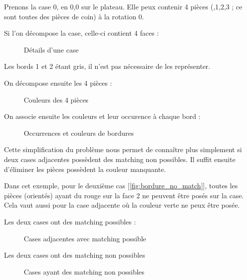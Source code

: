 	\begin{exmp}
		Prenons la case 0, en 0,0 sur le plateau. Elle peux contenir 4 pièces (,1,2,3 ; ce sont toutes des pièces de coin) à la rotation 0.
		
		
		Si l'on décompose la case, celle-ci contient 4 faces :
		
		\begin{figure}[H]
			

			\caption{Détails d'une case}\label{fig:case}
		\end{figure}
		
		Les bords 1 et 2 étant gris, il n'est pas nécessaire de les représenter. 
		\endminipage\hfill
	
		On décompose ensuite les 4 pièces :
		\begin{figure}[H]
			
			
			\caption{Couleurs des 4 pièces}\label{fig:4_pieces}
		\end{figure}
		\endminipage\hfill
			On associe ensuite les couleurs et leur occurence à chaque bord :
			\begin{figure}[H]
				
				
				\caption{Occurrences et couleurs de bordures}\label{fig:4_pieces_on_bordure}
			\end{figure}
		\endminipage\hfill
	\end{exmp}
	
	Cette simplification du problème nous permet de connaître plus simplement si deux cases adjacentes possèdent des matching non possibles.  Il suffit ensuite d'éliminer les pièces possèdent la couleur manquante.
		
	\begin{exmp} Dans cet exemple, pour le deuxième cas [\autoref{fig:bordure_no_match}], toutes les pièces (orientés) ayant du rouge sur la face 2 ne peuvent être posés sur la case. Cela vaut aussi pour la case adjacente où la couleur verte ne peux être posée.
			
		\minipage[t]{0.45\textwidth}
			Les deux cases ont des matching possibles :
			
			\begin{figure}[H]
				
				\caption{Cases adjacentes avec matching possible}\label{fig:bordure_match}
			\end{figure}
		
		\endminipage\hfill
		\minipage[t]{0.45\textwidth}
			Les deux cases ont des matching non possibles
			
			\begin{figure}[H]
				
				
				\caption{Cases ayant des matching non possibles}\label{fig:bordure_no_match}
			\end{figure}
			\endminipage\hfill
	\end{exmp}
	
